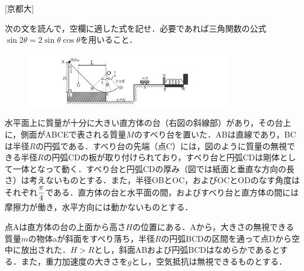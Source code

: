 


\noindent{} [京都大]

次の文を読んで，空欄に適した式を記せ．必要であれば三角関数の公式$\sin 2\theta = 2 \sin \theta \cos \theta$を用いること．

\begin{figure}
  \centering
  \includegraphics[width=9cm]{fig/fig_1_3.pdf}
\end{figure}
水平面上に質量が十分に大きい直方体の台（右図の斜線部）があり，その台上に，側面がABCEで表される質量$M$のすべり台を置いた．ABは直線であり，BCは半径$R$の円弧である．すべり台の先端（点C）には，図のように質量の無視できる半径$R$の円弧CDの板が取り付けられており，すべり台と円弧CDは剛体として一体となって動く．すべり台と円弧CDの厚み（図では紙面と垂直な方向の長さ）は考えないものとする．また，半径OBとOC，およびOCとODのなす角度はそれぞれ$\displaystyle\frac{\pi}{4}$である．直方体の台と水平面の間，およびすべり台と直方体の間には摩擦力が働き，水平方向には動かないものとする．

 点Aは直方体の台の上面から高さ$H$の位置にある．Aから，大きさの無視できる質量$m$の物体aが斜面をすべり落ち，半径$R$の円弧BCDの区間を通って点Dから空中に放出された．$H > R$とし，斜面ABおよび円弧BCDはなめらかであるとする．また，重力加速度の大きさを$g$とし，空気抵抗は無視できるものとする．

